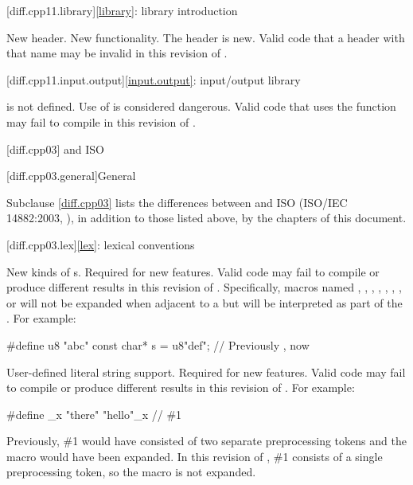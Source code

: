 [diff.cpp11.library]{\ref{library}: library introduction}

\change
New header.
\rationale
New functionality.
\effect
The \Cpp{} header  is new.
Valid \CppXI{} code that  a header with that name may be
invalid in this revision of \Cpp{}.

[diff.cpp11.input.output]{\ref{input.output}: input/output library}

\change
{} is not defined.
\rationale
Use of  is considered dangerous.
\effect
Valid \CppXI{} code that uses the  function may fail to compile
in this revision of \Cpp{}.

[diff.cpp03]{\Cpp{} and ISO \CppIII{}}

[diff.cpp03.general]{General}

\pnum
{}%
Subclause \ref{diff.cpp03} lists the differences between \Cpp{} and
ISO \CppIII{} (ISO/IEC 14882:2003, ),
in addition to those listed above,
by the chapters of this document.

[diff.cpp03.lex]{\ref{lex}: lexical conventions}

\change
New kinds of s.
\rationale
Required for new features.
\effect
Valid \CppIII{} code may fail to compile or produce different results in
this revision of \Cpp{}. Specifically, macros named , ,
, , , , , or  will
not be expanded when adjacent to a  but will be interpreted as
part of the . For example:
\begin{codeblock}
#define u8 "abc"
const char* s = u8"def";        // Previously , now 
\end{codeblock}

\change
User-defined literal string support.
\rationale
Required for new features.
\effect
Valid \CppIII{} code may fail to compile or produce different results in
this revision of \Cpp{}.
For example:
\begin{codeblock}
#define _x "there"
"hello"_x           // \#1
\end{codeblock}

Previously, \#1 would have consisted of two separate preprocessing tokens and
the macro  would have been expanded. In this revision of \Cpp{},
\#1 consists of a single preprocessing token, so the macro is not expanded.

